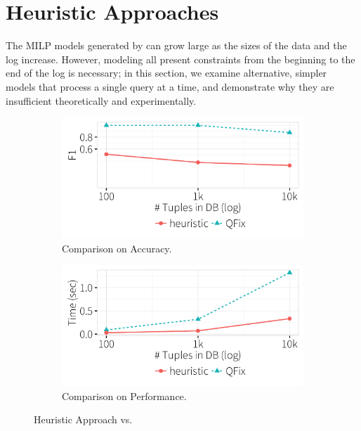 
\appendix

\section{Heuristic Approaches}
\label{sec:heuristic}
The MILP models generated by \sys can grow large as the sizes of the
data and the log increase. However, modeling all present constraints
from the beginning to the end of the log is necessary; in this
section, we examine alternative, simpler models that process a single
query at a time, and demonstrate why they are insufficient 
theoretically and experimentally.
  
  \begin{figure}[t]
  \centering
    \begin{subfigure} [t]{.3\textwidth}
    \includegraphics[width = .99\columnwidth]{figures/heuristicacc}
    \vspace*{-.25in}
    \caption{Comparison on Accuracy. }
    \vspace*{-.1in}
    \label{f:heuristic_acc} 
    \end{subfigure}
    \begin{subfigure} [t]{.3\textwidth}
    \includegraphics[width = .99\columnwidth]{figures/heuristictime}
    \vspace*{-.25in}
    \caption{Comparison on Performance. }
    \vspace*{-.1in}
    \label{f:heuristic_time} 
    \end{subfigure}
   \caption{Heuristic Approach vs. \sys}
   \vspace*{-.1in}
  \end{figure}
  
